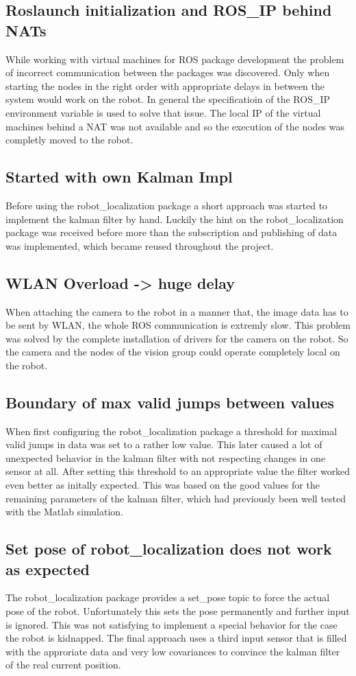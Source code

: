 \subsection{Roslaunch initialization and ROS\_IP behind NATs}
While working with virtual machines for ROS package development the problem of incorrect communication between the packages was discovered. Only when starting the nodes in the right order with appropriate delays in between the system would work on the robot. In general the specificatioin of the ROS\_IP environment variable is used to solve that issue. The local IP of the virtual machines behind a NAT was not available and so the execution of the nodes was completly moved to the robot.
\subsection{Started with own Kalman Impl}
Before using the robot\_localization package a short approach was started to implement the kalman filter by hand. Luckily the hint on the robot\_localization package was received before more than the subscription and publishing of data was implemented, which became reused throughout the project.
\subsection{WLAN Overload -> huge delay}
When attaching the camera to the robot in a manner that, the image data has to be sent by WLAN, the whole ROS communication is extremly slow. This problem was solved by the complete installation of drivers for the camera on the robot. So the camera and the nodes of the vision group could operate completely local on the robot.
\subsection{Boundary of max valid jumps between values}
When first configuring the robot\_localization package a threshold for maximal valid jumps in data was set to a rather low value. This later caused a lot of unexpected behavior in the kalman filter with not respecting changes in one sensor at all. After setting this threshold to an appropriate value the filter worked even better as initally expected. This was based on the good values for the remaining parameters of the kalman filter, which had previously been well tested with the Matlab simulation.
\subsection{Set pose of robot\_localization does not work as expected}
The robot\_localization package provides a set\_pose topic to force the actual pose of the robot. Unfortunately this sets the pose permanently and further input is ignored. This was not satisfying to implement a special behavior for the case the robot is kidnapped. The final approach uses a third input sensor that is filled with the approriate data and very low covariances to convince the kalman filter of the real current position.
